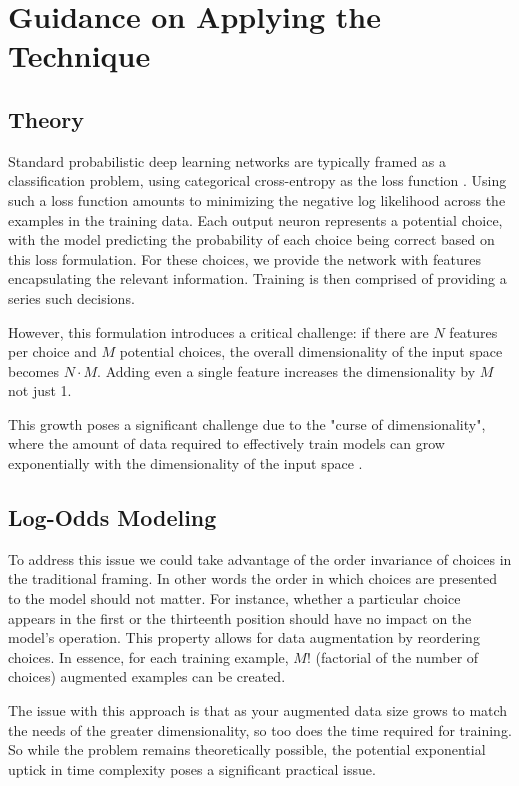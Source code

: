 \documentclass[11pt]{article}
\begin{document}
\section*{Guidance on Applying the Technique}

\subsection*{Theory}

Standard probabilistic deep learning networks are typically framed as a classification problem, using categorical cross-entropy as the loss function \citep{durr}. Using such a loss function amounts to minimizing the negative log likelihood across the examples in the training data. Each output neuron represents a potential choice, with the model predicting the probability of each choice being correct based on this loss formulation. For these choices, we provide the network with features encapsulating the relevant information. Training is then comprised of providing a series such decisions. 

However, this formulation introduces a critical challenge: if there are $N$ features per choice and $M$ potential choices, the overall dimensionality of the input space becomes $N \cdot M$. Adding even a single feature increases the dimensionality by $M$ not just 1.

This growth poses a significant challenge due to the "curse of dimensionality", where the amount of data required to effectively train models can grow exponentially with the dimensionality of the input space \citep{curse}.

\subsection*{Log-Odds Modeling}

To address this issue we could take advantage of the order invariance of choices in the traditional framing. In other words the order in which choices are presented to the model should not matter. For instance, whether a particular choice appears in the first or the thirteenth position should have no impact on the model's operation. This property allows for data augmentation by reordering choices. In essence, for each training example, $M!$ (factorial of the number of choices) augmented examples can be created.

The issue with this approach is that as your augmented data size grows to match the needs of the greater dimensionality, so too does the time required for training. So while the problem remains theoretically possible, the potential exponential uptick in time complexity poses a significant practical issue. \newline
\end{document}
